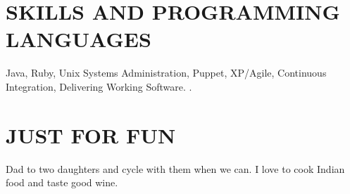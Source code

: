 \documentclass{res}
\begin{document}
\begin{resume}

\section{SKILLS AND PROGRAMMING LANGUAGES}          
    Java, Ruby, Unix Systems Administration, Puppet, XP/Agile, Continuous Integration, Delivering Working Software.
.
     
\section{JUST FOR FUN}          
    Dad to two daughters and cycle with them when we can. I love to cook Indian food and taste good wine.

\end{resume}
\end{document}
